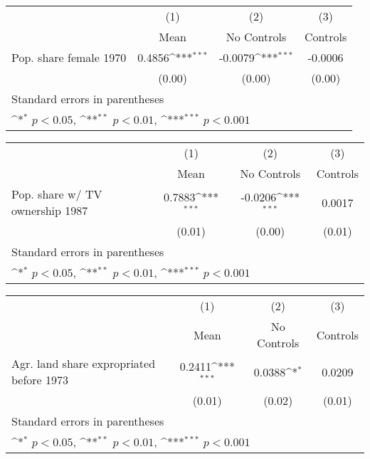 {
\def\sym#1{\ifmmode^{#1}\else\(^{#1}\)\fi}
\begin{tabular}{l*{3}{c}}
\hline\hline
                    &\multicolumn{1}{c}{(1)}&\multicolumn{1}{c}{(2)}&\multicolumn{1}{c}{(3)}\\
                    &\multicolumn{1}{c}{Mean}&\multicolumn{1}{c}{No Controls}&\multicolumn{1}{c}{Controls}\\
\hline
Pop. share female 1970&      0.4856\sym{***}&     -0.0079\sym{***}&     -0.0006         \\
                    &      (0.00)         &      (0.00)         &      (0.00)         \\
\hline\hline
\multicolumn{4}{l}{\footnotesize Standard errors in parentheses}\\
\multicolumn{4}{l}{\footnotesize \sym{*} \(p<0.05\), \sym{**} \(p<0.01\), \sym{***} \(p<0.001\)}\\
\end{tabular}
}
{
\def\sym#1{\ifmmode^{#1}\else\(^{#1}\)\fi}
\begin{tabular}{l*{3}{c}}
\hline\hline
                    &\multicolumn{1}{c}{(1)}&\multicolumn{1}{c}{(2)}&\multicolumn{1}{c}{(3)}\\
                    &\multicolumn{1}{c}{Mean}&\multicolumn{1}{c}{No Controls}&\multicolumn{1}{c}{Controls}\\
\hline
Pop. share w/ TV ownership 1987&      0.7883\sym{***}&     -0.0206\sym{***}&      0.0017         \\
                    &      (0.01)         &      (0.00)         &      (0.01)         \\
\hline\hline
\multicolumn{4}{l}{\footnotesize Standard errors in parentheses}\\
\multicolumn{4}{l}{\footnotesize \sym{*} \(p<0.05\), \sym{**} \(p<0.01\), \sym{***} \(p<0.001\)}\\
\end{tabular}
}
{
\def\sym#1{\ifmmode^{#1}\else\(^{#1}\)\fi}
\begin{tabular}{l*{3}{c}}
\hline\hline
                    &\multicolumn{1}{c}{(1)}&\multicolumn{1}{c}{(2)}&\multicolumn{1}{c}{(3)}\\
                    &\multicolumn{1}{c}{Mean}&\multicolumn{1}{c}{No Controls}&\multicolumn{1}{c}{Controls}\\
\hline
Agr. land share expropriated before 1973&      0.2411\sym{***}&      0.0388\sym{*}  &      0.0209         \\
                    &      (0.01)         &      (0.02)         &      (0.01)         \\
\hline\hline
\multicolumn{4}{l}{\footnotesize Standard errors in parentheses}\\
\multicolumn{4}{l}{\footnotesize \sym{*} \(p<0.05\), \sym{**} \(p<0.01\), \sym{***} \(p<0.001\)}\\
\end{tabular}
}
